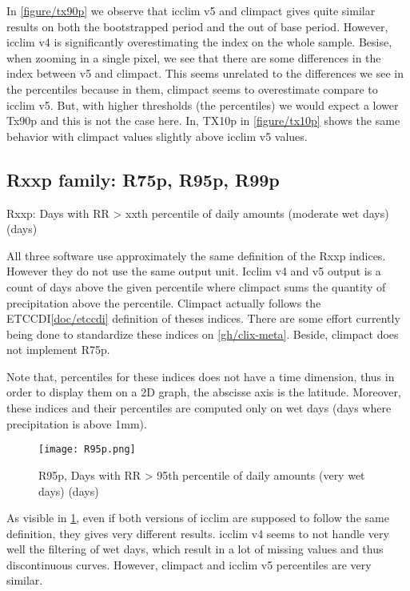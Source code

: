\documentclass[a4paper,11pt]{article}
\begin{document}
    In \ref{figure/tx90p} we observe that icclim v5 and climpact gives quite similar results on both the bootstrapped period and the out of base period.
    However, icclim v4 is significantly overestimating the index on the whole sample.
    Besise, when zooming in a single pixel, we see that there are some differences in the index between v5 and climpact. This seems unrelated to the differences we see in the percentiles because in them, climpact seems to overestimate compare to icclim v5. But, with higher thresholds (the percentiles) we would expect a lower Tx90p and this is not the case here.
    In, TX10p in \ref{figure/tx10p} shows the same behavior with climpact values slightly above icclim v5 values.

\subsection{Rxxp family: R75p, R95p, R99p}
    Rxxp: Days with RR > xxth percentile of daily amounts (moderate wet days)(days)

    All three software use approximately the same definition of the Rxxp indices. However they do not use the same output unit. Icclim v4 and v5 output is a count of days above the given percentile where climpact sums the quantity of precipitation above the percentile. Climpact actually follows the ETCCDI\ref{doc/etccdi} definition of theses indices.
    There are some effort currently being done to standardize these indices on \ref{gh/clix-meta}.
    Beside, climpact does not implement R75p.

    Note that, percentiles for these indices does not have a time dimension, thus in order to display them on a 2D graph, the abscisse axis is the latitude.
    Moreover, these indices and their percentiles are computed only on wet days (days where precipitation is above 1mm).

    \begin{figure}
        \centering
        \texttt{[image: R95p.png]}
        \caption{R95p, Days with RR > 95th percentile of daily amounts (very wet days) (days)}
        \label{figure/r95p}
    \end{figure}

    As visible in \ref{figure/r95p}, even if both versions of icclim are supposed to follow the same definition, they gives very different results.
    icclim v4 seems to not handle very well the filtering of wet days, which result in a lot of missing values and thus discontinuous curves.
    However, climpact and icclim v5 percentiles are very similar.
\end{document}
